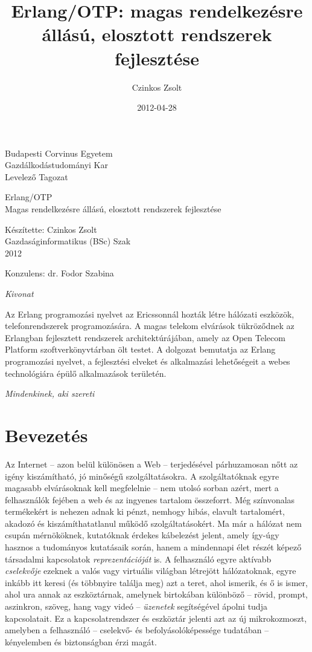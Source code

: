\documentclass[12pt, a4paper, oneside]{book}
\author{Czinkos Zsolt}
\title{Erlang/OTP: magas rendelkezésre állású, elosztott rendszerek fejlesztése}
\date{2012-04-28}
\newenvironment{abstract}
{\newpage \pagestyle{empty} \vspace*{\fill} \begin{center}\em{Kivonat}\end{center}}
{\vspace*{\fill} \newpage}
\renewcommand{\maketitle}{
\begin{titlepage}
\noindent Budapesti Corvinus Egyetem\\
Gazdálkodástudományi Kar\\
Levelező Tagozat\\

\vspace{6cm}

\begin{center}
\Large{Erlang/OTP}\\
\vspace{0.3cm}
\large{Magas rendelkezésre állású, elosztott rendszerek
fejlesztése}
\end{center}

\vfill

\begin{flushright}
Készítette: Czinkos Zsolt\\
Gazdaságinformatikus (BSc) Szak\\
2012\\
\end{flushright}

\vspace{0.5cm}

\begin{center}
Konzulens: dr. Fodor Szabina
\end{center}

\end{titlepage}
}
\begin{document}
\maketitle

\onehalfspacing

\begin{abstract}
Az Erlang programozási nyelvet az Ericssonnál hozták létre hálózati
eszközök, telefonrendszerek programozására. A magas telekom elvárások
tükröződnek az Erlangban fejlesztett rendszerek architektúrájában,
amely az Open Telecom Platform szoftverkönyvtárban ölt testet. A dolgozat
bemutatja az Erlang programozási nyelvet, a fejlesztési elveket és
alkalmazási lehetőségeit a webes technológiára épülő alkalmazások területén.
\end{abstract}

\newpage
\pagestyle{empty}
\vspace*{\fill} 
\hfill \emph{Mindenkinek, aki szereti}
\vspace*{\fill} 
\newpage

\pagestyle{fancy}

\tableofcontents

\chapter{Bevezetés}

Az Internet -- azon belül különösen a Web -- terjedésével párhuzamosan nőtt az
igény kiszámítható, jó minőségű szolgáltatásokra. A szolgáltatóknak egyre
magasabb elvárásoknak kell megfelelnie -- nem utolsó sorban azért, mert a
felhasználók fejében a web és az ingyenes tartalom összeforrt. Még színvonalas
termékekért is nehezen adnak ki pénzt, nemhogy hibás, elavult tartalomért,
akadozó és kiszámíthatatlanul működő szolgáltatásokért. Ma már a hálózat nem
csupán mérnököknek, kutatóknak érdekes kábelezést jelent, amely így-úgy hasznos
a tudományos kutatásaik során, hanem a mindennapi élet részét képező társadalmi
kapcsolatok \textit{reprezentációját} is. A felhasználó egyre aktívabb
\textit{cselekvője} ezeknek a valós vagy virtuális világban létrejött
hálózatoknak, egyre inkább itt keresi (és többnyire találja meg) azt a teret,
ahol ismerik, és ő is ismer, ahol ura annak az eszköztárnak, amelynek
birtokában különböző -- rövid, prompt, aszinkron, szöveg, hang vagy videó --
\textit{üzenetek} segítségével ápolni tudja kapcsolatait. Ez a
kapcsolatrendszer és eszköztár jelenti azt az új mikrokozmoszt, amelyben a
felhasználó -- cselekvő- és befolyásolóképessége tudatában -- kényelemben és
biztonságban érzi magát.
\end{document}
